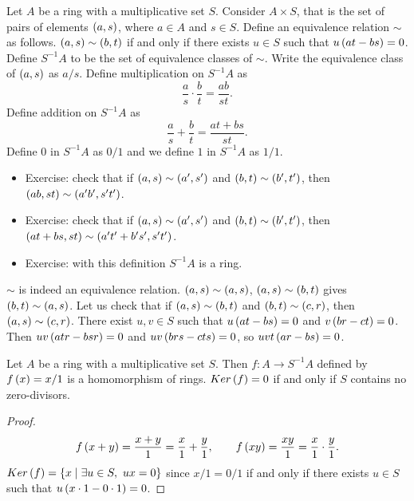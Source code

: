 \begin{definition}
Let $ A $ be a ring with a multiplicative set $ S $. Consider $ A \times S $, that is the set of pairs of elements $ \left( a, s \right) $, where $ a \in A $ and $ s \in S $. Define an equivalence relation $ \sim $ as follows. $ \left( a, s \right) \sim \left( b, t \right) $ if and only if there exists $ u \in S $ such that $ u\left( at - bs \right) = 0 $. Define $ S^{-1}A $ to be the set of equivalence classes of $ \sim $. Write the equivalence class of $ \left( a, s \right) $ as $ a / s $. Define multiplication on $ S^{-1}A $ as
$$ \dfrac{a}{s} \cdot \dfrac{b}{t} = \dfrac{ab}{st}. $$
Define addition on $ S^{-1}A $ as
$$ \dfrac{a}{s} + \dfrac{b}{t} = \dfrac{at + bs}{st}. $$
Define $ 0 $ in $ S^{-1}A $ as $ 0 / 1 $ and we define $ 1 $ in $ S^{-1}A $ as $ 1 / 1 $.
\begin{itemize}
\item Exercise: check that if $ \left( a, s \right) \sim \left( a', s' \right) $ and $ \left( b, t \right) \sim \left( b', t' \right) $, then $ \left( ab, st \right) \sim \left( a'b', s't' \right) $.
\item Exercise: check that if $ \left( a, s \right) \sim \left( a', s' \right) $ and $ \left( b, t \right) \sim \left( b', t' \right) $, then $ \left( at + bs, st \right) \sim \left( a't' + b's', s't' \right) $.
\item Exercise: with this definition $ S^{-1}A $ is a ring.
\end{itemize}
\end{definition}

\begin{remark}
$ \sim $ is indeed an equivalence relation. $ \left( a, s \right) \sim \left( a, s \right) $, $ \left( a, s \right) \sim \left( b, t \right) $ gives $ \left( b, t \right) \sim \left( a, s \right) $. Let us check that if $ \left( a, s \right) \sim \left( b, t \right) $ and $ \left( b, t \right) \sim \left( c, r \right) $, then $ \left( a, s \right) \sim \left( c, r \right) $. There exist $ u, v \in S $ such that $ u\left( at - bs \right) = 0 $ and $ v\left( br - ct \right) = 0 $. Then $ uv\left( atr - bsr \right) = 0 $ and $ uv\left( brs - cts \right) = 0 $, so $ uvt\left( ar - bs \right) = 0 $.
\end{remark}

\begin{lemma}
Let $ A $ be a ring with a multiplicative set $ S $. Then $ f : A \to S^{-1}A $ defined by $ f\left( x \right) = x / 1 $ is a homomorphism of rings. $ Ker\left( f \right) = 0 $ if and only if $ S $ contains no zero-divisors.
\end{lemma}

\begin{proof}
$$ f\left( x + y \right) = \dfrac{x + y}{1} = \dfrac{x}{1} + \dfrac{y}{1}, \qquad f\left( xy \right) = \dfrac{xy}{1} = \dfrac{x}{1} \cdot \dfrac{y}{1}. $$
$ Ker\left( f \right) = \left\{ x \mid \exists u \in S, \ ux = 0 \right\} $ since $ x / 1 = 0 / 1 $ if and only if there exists $ u \in S $ such that $ u\left( x \cdot 1 - 0 \cdot 1 \right) = 0 $.
\end{proof}

